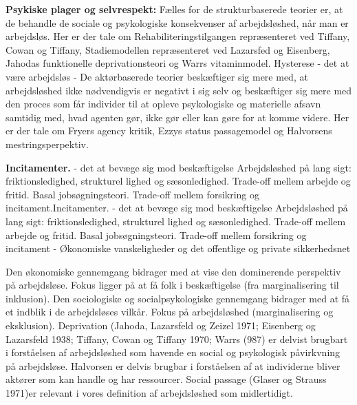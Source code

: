 \textbf{Psykiske plager og selvrespekt:} Fælles for de strukturbaserede teorier er, at de behandle de sociale og psykologiske konsekvenser af arbejdsløshed, når man er arbejdsløs. Her er der tale om Rehabiliteringstilgangen repræsenteret ved Tiffany, Cowan og Tiffany, Stadiemodellen repræsenteret ved Lazarsfed og Eisenberg, Jahodas funktionelle deprivationsteori og Warrs vitaminmodel. Hysterese - det at være arbejdsløs - De aktørbaserede teorier beskæftiger sig mere med, at arbejdsløshed ikke nødvendigvis er negativt i sig selv og beskæftiger sig mere med den proces som får individer til at opleve psykologiske og materielle afsavn samtidig med, hvad agenten gør, ikke gør eller kan gøre for at komme videre. Her er der tale om Fryers agency kritik, Ezzys status passagemodel og Halvorsens mestringsperpektiv.

\textbf{Incitamenter.} - det at bevæge sig mod beskæftigelse Arbejdsløshed på lang sigt: friktionsledighed, strukturel lighed og sæsonledighed. Trade-off mellem arbejde og fritid. Basal jobsøgningsteori. Trade-off mellem forsikring og incitament.Incitamenter. - det at bevæge sig mod beskæftigelse Arbejdsløshed på lang sigt: friktionsledighed, strukturel lighed og sæsonledighed. Trade-off mellem arbejde og fritid. Basal jobsøgningsteori. Trade-off mellem forsikring og incitament - Økonomiske vanskeligheder og det offentlige og private sikkerhedsnet 

Den økonomiske gennemgang bidrager med at vise den dominerende perspektiv på arbejdsløse. Fokus ligger på at få folk i beskæftigelse (fra marginalisering til inklusion). Den sociologiske og socialpsykologiske gennemgang bidrager med at få et indblik i de arbejdsløses vilkår. Fokus på arbejdsløshed (marginalisering og eksklusion). Deprivation (Jahoda, Lazarsfeld og Zeizel 1971; Eisenberg og Lazarsfeld 1938; Tiffany, Cowan og Tiffany 1970; Warrs (987) er delvist brugbart i forståelsen af arbejdsløshed som havende en social og psykologisk påvirkvning på arbejdsløse. Halvorsen er delvis brugbar i forståelsen af at individerne bliver aktører som kan handle og har ressourcer. Social passage (Glaser og Strauss 1971)er relevant i vores definition af arbejdsløshed som midlertidigt.

% 
\begin{table}[H]
\centering
\caption{Oversigt over økonomiske og sociologiske teoriperspektiver}
\label{tab_spellrun}
\end{table}
% 


